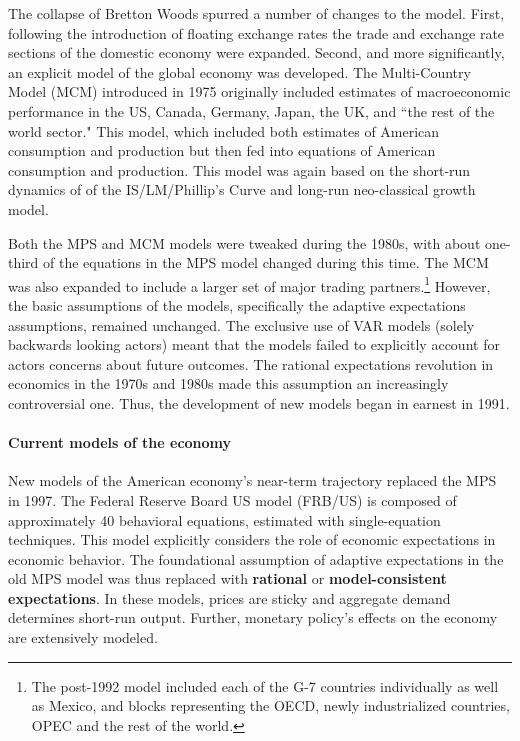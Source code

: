 \documentclass[a4paper]{article}\usepackage{graphicx, color}
\begin{document}
The collapse of Bretton Woods spurred a number of changes to the model. First, following the introduction of floating exchange rates the trade and exchange rate sections of the domestic economy were expanded. Second, and more significantly, an explicit model of the global economy was developed. The Multi-Country Model (MCM) introduced in 1975 originally included estimates of macroeconomic performance in the US, Canada, Germany, Japan, the UK, and ``the rest of the world sector." This model, which included both estimates of American consumption and production but then fed into equations of American consumption and production. This model was again based on the short-run dynamics of of the IS/LM/Phillip's Curve and long-run neo-classical growth model.

Both the MPS and MCM models were tweaked during the 1980s, with about one-third of the equations in the MPS model changed during this time. The MCM was also expanded to include a larger set of major trading partners.\footnote{The post-1992 model included each of the G-7 countries individually as well as Mexico, and blocks representing the OECD, newly industrialized countries, OPEC and the rest of the world.} However, the basic assumptions of the models, specifically the adaptive expectations assumptions, remained unchanged. The exclusive use of VAR models (solely backwards looking actors) meant that the models failed to explicitly account for actors concerns about future outcomes. The rational expectations revolution in economics in the 1970s and 1980s made this assumption an increasingly controversial one. Thus, the development of new models began in earnest in 1991.
 
\paragraph{Current models of the economy}
New models of the American economy's near-term trajectory replaced the MPS in 1997. The Federal Reserve Board US model (FRB/US) is composed of approximately 40 behavioral equations, estimated with single-equation techniques. This model explicitly considers the role of economic expectations in economic behavior. The foundational assumption of adaptive expectations in the old MPS model was thus replaced with {\bf{rational}} or {\bf{model-consistent expectations}}. In these models, prices are sticky and aggregate demand determines short-run output. Further, monetary policy's effects on the economy are extensively modeled. 
\end{document}
